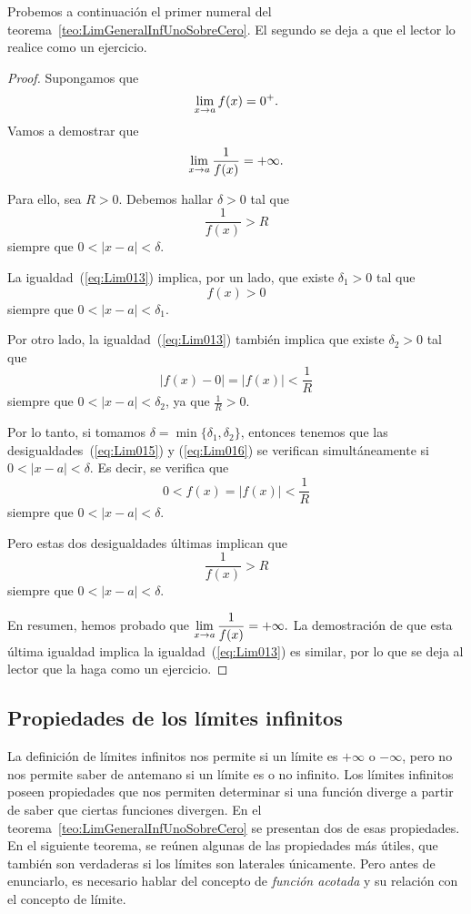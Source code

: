 Probemos a continuación el primer numeral del teorema~\ref{teo:LimGeneralInfUnoSobreCero}. El
segundo se deja a que el lector lo realice como un ejercicio.
\begin{proof}
Supongamos que
\begin{equation}
\label{eq:Lim013}
\limjc{f(x)}{x}{a} = 0^+.
\end{equation}
Vamos a demostrar que
\[
\limjc{\frac{1}{f(x)}}{x}{a} = +\infty.
\]

Para ello, sea $R > 0$. Debemos hallar $\delta > 0$ tal que
\begin{equation}
\label{eq:Lim014}
\frac{1}{f(x)} > R
\end{equation}
siempre que $0 < |x - a| < \delta$.

La igualdad~(\ref{eq:Lim013}) implica, por un lado, que existe $\delta_1 > 0$ tal que
\begin{equation}
\label{eq:Lim015}
f(x) > 0
\end{equation}
siempre que $0 < |x - a| < \delta_1$.

Por otro lado, la igualdad~(\ref{eq:Lim013}) también implica que existe $\delta_2 > 0$ tal que
\begin{equation}
\label{eq:Lim016}
|f(x) - 0| = |f(x)| < \frac{1}{R}
\end{equation}
siempre que $0 < |x - a| < \delta_2$, ya que $\frac{1}{R} > 0$.

Por lo tanto, si tomamos $\delta = \min\{\delta_1,\delta_2\}$, entonces tenemos que las
desigualdades~(\ref{eq:Lim015}) y (\ref{eq:Lim016}) se verifican simultáneamente si $0 < |x - a| <
\delta$. Es decir, se verifica que
\[
0 < f(x) = |f(x)| < \frac{1}{R}
\]
siempre que $0 < |x - a| < \delta$.

Pero estas dos desigualdades últimas implican que
\[
\frac{1}{f(x)} > R
\]
siempre que $0 < |x - a| < \delta$.

En resumen, hemos probado que
$\displaystyle
\limjc{\frac{1}{f(x)}}{x}{a} = +\infty.
$
La demostración de que esta última igualdad implica la igualdad~(\ref{eq:Lim013}) es similar, por
lo que se deja al lector que la haga como un ejercicio.
\end{proof}

\subsection{Propiedades de los límites infinitos}
La definición de límites infinitos nos permite si un límite es $+\infty$ o $-\infty$, pero no nos
permite saber de antemano si un límite es o no infinito. Los límites infinitos poseen propiedades
que nos permiten determinar si una función diverge a partir de saber que ciertas funciones
divergen. En el teorema~\ref{teo:LimGeneralInfUnoSobreCero} se presentan dos de esas propiedades.
En el siguiente teorema, se reúnen algunas de las propiedades más útiles, que también son
verdaderas si los límites son laterales únicamente. Pero antes de enunciarlo, es necesario hablar
del concepto de \emph{función acotada} y su relación con el concepto de límite.

